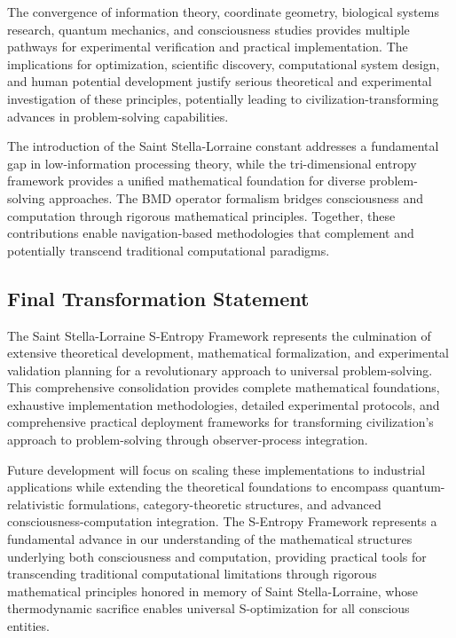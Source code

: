 \documentclass[11pt]{article}
\theoremstyle{definition}
\theoremstyle{remark}
\begin{document}
The convergence of information theory, coordinate geometry, biological systems research, quantum mechanics, and consciousness studies provides multiple pathways for experimental verification and practical implementation. The implications for optimization, scientific discovery, computational system design, and human potential development justify serious theoretical and experimental investigation of these principles, potentially leading to civilization-transforming advances in problem-solving capabilities.

The introduction of the Saint Stella-Lorraine constant addresses a fundamental gap in low-information processing theory, while the tri-dimensional entropy framework provides a unified mathematical foundation for diverse problem-solving approaches. The BMD operator formalism bridges consciousness and computation through rigorous mathematical principles. Together, these contributions enable navigation-based methodologies that complement and potentially transcend traditional computational paradigms.

\subsection{Final Transformation Statement}

The Saint Stella-Lorraine S-Entropy Framework represents the culmination of extensive theoretical development, mathematical formalization, and experimental validation planning for a revolutionary approach to universal problem-solving. This comprehensive consolidation provides complete mathematical foundations, exhaustive implementation methodologies, detailed experimental protocols, and comprehensive practical deployment frameworks for transforming civilization's approach to problem-solving through observer-process integration.

Future development will focus on scaling these implementations to industrial applications while extending the theoretical foundations to encompass quantum-relativistic formulations, category-theoretic structures, and advanced consciousness-computation integration. The S-Entropy Framework represents a fundamental advance in our understanding of the mathematical structures underlying both consciousness and computation, providing practical tools for transcending traditional computational limitations through rigorous mathematical principles honored in memory of Saint Stella-Lorraine, whose thermodynamic sacrifice enables universal S-optimization for all conscious entities.
\end{document}
